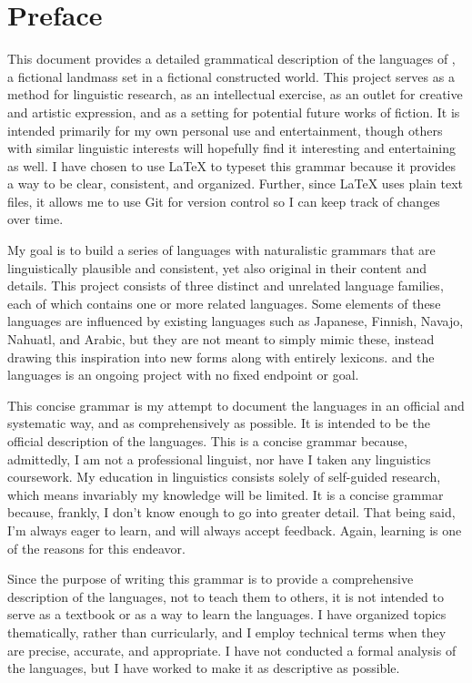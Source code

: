 \chapter{Preface}
\label{cha:preface}

This document provides a detailed grammatical description of the languages of \landn, a fictional landmass set in a fictional constructed world. This project serves as a method for linguistic research, as an intellectual exercise, as an outlet for creative and artistic expression, and as a setting for potential future works of fiction. It is intended primarily for my own personal use and entertainment, though others with similar linguistic interests will hopefully find it interesting and entertaining as well. I have chosen to use \LaTeX{} to typeset this grammar because it provides a way to be clear, consistent, and organized. Further, since \LaTeX{} uses plain text files, it allows me to use Git for version control so I can keep track of changes over time.

My goal is to build a series of languages with naturalistic grammars that are linguistically plausible and consistent, yet also original in their content and details. This project consists of three distinct and unrelated language families, each of which contains one or more related languages. Some elements of these languages are influenced by existing languages such as Japanese, Finnish, Navajo, Nahuatl, and Arabic, but they are not meant to simply mimic these, instead drawing this inspiration into new forms along with entirely  lexicons. \landn{} and the \landadj{} languages is an ongoing project with no fixed endpoint or goal.

This concise grammar is my attempt to document the \landadj{} languages in an official and systematic way, and as comprehensively as possible. It is intended to be the official description of the languages. This is a concise grammar because, admittedly, I am not a professional linguist, nor have I taken any linguistics coursework. My education in linguistics consists solely of self-guided research, which means invariably my knowledge will be limited. It is a concise grammar because, frankly, I don't know enough to go into greater detail. That being said, I'm always eager to learn, and will always accept feedback. Again, learning is one of the reasons for this endeavor.

Since the purpose of writing this grammar is to provide a comprehensive description of the \landadj{} languages, not to teach them to others, it is not intended to serve as a textbook or as a way to learn the languages. I have organized topics thematically, rather than curricularly, and I employ technical terms when they are precise, accurate, and appropriate. I have not conducted a formal analysis of the languages, but I have worked to make it as descriptive as possible.

